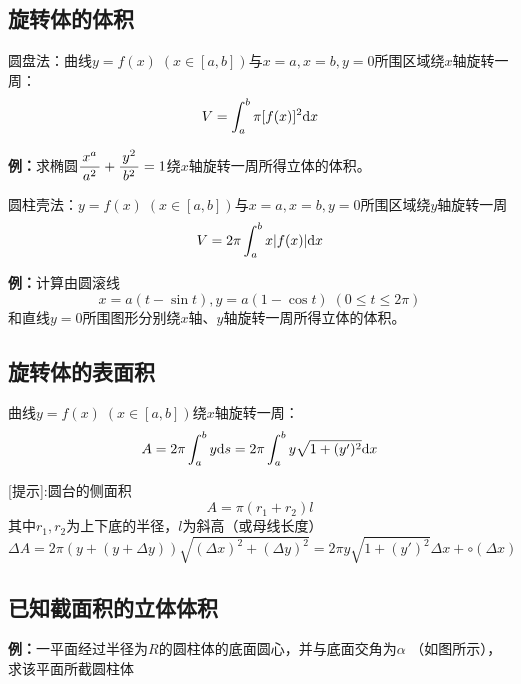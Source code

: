 \subsection{旋转体的体积}

圆盘法：曲线$y=f(x)\;(x\in[a,b])$与$x=a,x=b,y=0$所围区域绕$x$轴旋转一周：
$$V=\displaystyle\int_a^b\pi[f(x)]^2\mathrm{d} x$$

{\bf 例：}求椭圆$\displaystyle\frac{\,{x^a}\,}{\,{a^2}\,}+\displaystyle\frac{\,{y^2}\,}{\,{b^2}\,}=1$绕$x$轴旋转一周所得立体的体积。

圆柱壳法：$y=f(x)\;(x\in[a,b])$与$x=a,x=b,y=0$所围区域绕$y$轴旋转一周
$$V=2\pi\displaystyle\int_a^bx|f(x)|\mathrm{d} x$$

{\bf 例：}计算由圆滚线$$x=a(t-\sin t),y=a(1-\cos t)\;(0\leq t\leq 2\pi)$$
和直线$y=0$所围图形分别绕$x$轴、$y$轴旋转一周所得立体的体积。

\subsection{旋转体的表面积}
曲线$y=f(x)\;(x\in[a,b])$绕$x$轴旋转一周：
$$A=2\pi \displaystyle\int_a^by\mathrm{d} s=2\pi \displaystyle\int_a^by\sqrt{1+(y')^2}\mathrm{d} x$$

[提示]:圆台的侧面积
$$A=\pi(r_1+r_2)l$$
其中$r_1,r_2$为上下底的半径，$l$为斜高（或母线长度）
$$\Delta A=2\pi(y+(y+\Delta y))\sqrt{(\Delta x)^2+(\Delta y)^2}
=2\pi y\sqrt{1+(y')^2}\Delta x+\circ(\Delta x)$$

\subsection{已知截面积的立体体积}

{\bf 例：}一平面经过半径为$R$的圆柱体的底面圆心，并与底面交角为$\alpha$
（如图所示），求该平面所截圆柱体

\begin{center}
\end{center}

